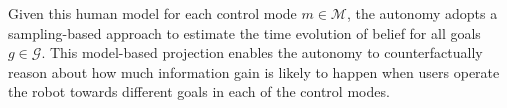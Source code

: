 \documentclass[conference]{IEEEtran}
\DeclareMathOperator*{\argmax}{argmax}
\newcommand{\norm}[1]{\left\lVert#1\right\rVert}
\begin{document}
Given this human model for each control mode $m \in \mathcal{M}$, the autonomy adopts a sampling-based approach to estimate the time evolution of belief for all goals $g \in \mathcal{G}$. This model-based projection enables the autonomy to counterfactually reason about how much information gain is likely to happen when users operate the robot towards different goals in each of the control modes. 



%

\end{document}
